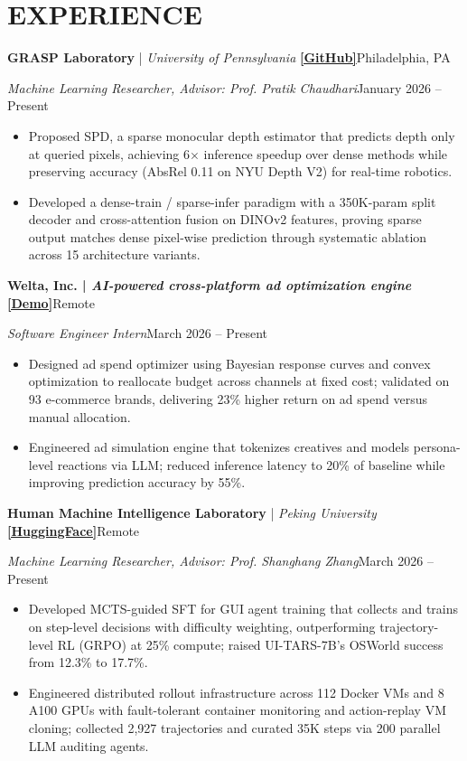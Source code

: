 \documentclass[10pt,letterpaper]{article}
\newcommand{\ressection}[1]{\section*{#1}}
\newcommand{\resheading}[4]{%
    \textbf{#1}\hfill #2\par
    \textit{#3}\hfill #4\par
}
\begin{document}
\ressection{EXPERIENCE}
\vspace{2pt}
\textbf{GRASP Laboratory} \;|\; \textit{University of Pennsylvania} \textbf{\href{https://github.com/ArtysicistZ/Sparse-Query-Point-Depth}{[GitHub]}}\hfill Philadelphia, PA \par
\textit{Machine Learning Researcher, Advisor: Prof. Pratik Chaudhari}\hfill January 2026 -- Present
\begin{itemize}
    \item Proposed SPD, a sparse monocular depth estimator that predicts depth only at queried pixels, achieving 6$\times$ inference speedup over dense methods while preserving accuracy (AbsRel 0.11 on NYU Depth V2) for real-time robotics.
    \item Developed a dense-train / sparse-infer paradigm with a 350K-param split decoder and cross-attention fusion on DINOv2 features, proving sparse output matches dense pixel-wise prediction through systematic ablation across 15 architecture variants.
\end{itemize}
\vspace{3pt}
\resheading{Welta, Inc. \;|\; \normalfont\textit{AI-powered cross-platform ad optimization engine} \textbf{\href{https://app.welta.ai}{[Demo]}}}{Remote}{Software Engineer Intern}{March 2026 -- Present}
\begin{itemize}
    \item Designed ad spend optimizer using Bayesian response curves and convex optimization to reallocate budget across channels at fixed cost; validated on 93 e-commerce brands, delivering 23\% higher return on ad spend versus manual allocation.
    \item Engineered ad simulation engine that tokenizes creatives and models persona-level reactions via LLM; reduced inference latency to 20\% of baseline while improving prediction accuracy by 55\%.
\end{itemize}
\vspace{3pt}
\textbf{Human Machine Intelligence Laboratory} \;|\; \textit{Peking University} \textbf{\href{https://huggingface.co/ArtysicistZ/UI-TARS-MCTS-V2-7B}{[HuggingFace]}}\hfill Remote \par
\textit{Machine Learning Researcher, Advisor: Prof. Shanghang Zhang}\hfill March 2026 -- Present
\begin{itemize}
    \item Developed MCTS-guided SFT for GUI agent training that collects and trains on step-level decisions with difficulty weighting, outperforming trajectory-level RL (GRPO) at 25\% compute; raised UI-TARS-7B's OSWorld success from 12.3\% to 17.7\%.
    \item Engineered distributed rollout infrastructure across 112 Docker VMs and 8 A100 GPUs with fault-tolerant container monitoring and action-replay VM cloning; collected 2,927 trajectories and curated 35K steps via 200 parallel LLM auditing agents.
\end{itemize}
\end{document}
